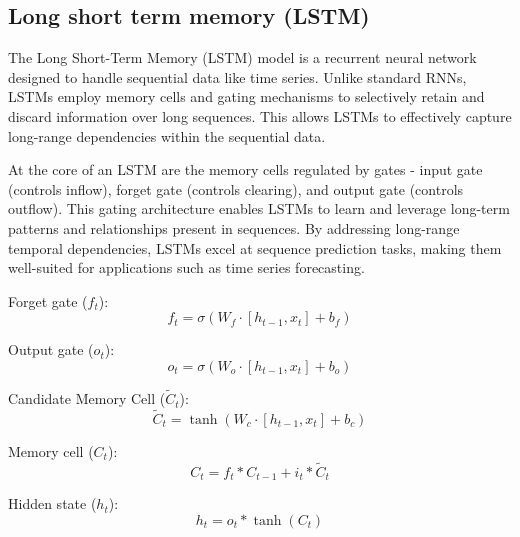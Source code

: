 \documentclass{ieeeojies}
\begin{document}
\subsection{Long short term memory (LSTM)}
The Long Short-Term Memory (LSTM) model is a recurrent neural network designed to handle sequential data like time series. Unlike standard RNNs, LSTMs employ memory cells and gating mechanisms to selectively retain and discard information over long sequences. This allows LSTMs to effectively capture long-range dependencies within the sequential data\cite{LSTM1}.

At the core of an LSTM are the memory cells regulated by gates - input gate (controls inflow), forget gate (controls clearing), and output gate (controls outflow). This gating architecture enables LSTMs to learn and leverage long-term patterns and relationships present in sequences. By addressing long-range temporal dependencies, LSTMs excel at sequence prediction tasks, making them well-suited for applications such as time series forecasting\cite{LSTM2}.

Forget gate ($f_t$): 
\[f_t = \sigma(W_f \cdot [h_{t-1}, x_t] + b_f)\] 

Output gate ($o_t$): 
\[o_t = \sigma(W_o \cdot [h_{t-1}, x_t] + b_o)\]

Candidate Memory Cell ($\tilde{C}_t$): 
\[\tilde{C}_t = \tanh(W_c \cdot [h_{t-1}, x_t] + b_c) \]

Memory cell ($C_t$): 
\[C_t = f_t \ast C_{t-1} + i_t \ast \tilde{C}_t\]

Hidden state ($h_t$): 
\[h_t = o_t \ast \tanh(C_t)\]
\end{document}
